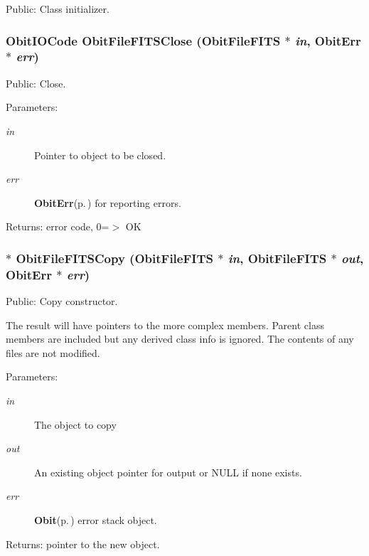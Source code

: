 Public: Class initializer. 

\subsubsection{\setlength{\rightskip}{0pt plus 5cm}Obit\-IOCode Obit\-File\-FITSClose ({\bf Obit\-File\-FITS} $\ast$ {\em in}, {\bf Obit\-Err} $\ast$ {\em err})}\label{ObitFileFITS_8h_a10}


Public: Close. 

\begin{Desc}
\item[Parameters:]
\begin{description}
\item[{\em in}]Pointer to object to be closed. \item[{\em err}]{\bf Obit\-Err}{\rm (p.\,\pageref{structObitErr})} for reporting errors. \end{description}
\end{Desc}
\begin{Desc}
\item[Returns:]error code, 0=$>$ OK \end{Desc}
\subsubsection{$\ast$ Obit\-File\-FITSCopy ({\bf Obit\-File\-FITS} $\ast$ {\em in}, {\bf Obit\-File\-FITS} $\ast$ {\em out}, {\bf Obit\-Err} $\ast$ {\em err})}\label{ObitFileFITS_8h_a8}


Public: Copy constructor. 

The result will have pointers to the more complex members. Parent class members are included but any derived class info is ignored. The contents of any files are not modified. \begin{Desc}
\item[Parameters:]
\begin{description}
\item[{\em in}]The object to copy \item[{\em out}]An existing object pointer for output or NULL if none exists. \item[{\em err}]{\bf Obit}{\rm (p.\,\pageref{structObit})} error stack object. \end{description}
\end{Desc}
\begin{Desc}
\item[Returns:]pointer to the new object. \end{Desc}

